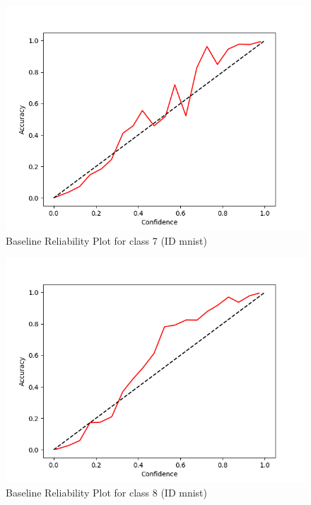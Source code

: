\documentclass[11pt]{article}
\begin{document}
\begin{figure}[htbp]
\centering
\includegraphics[width=.9\linewidth]{./base_mnist_rel_7.png}
\caption{\label{fig:orgc5350fc}
Baseline Reliability Plot for class 7 (ID mnist)}
\end{figure}

\begin{figure}[htbp]
\centering
\includegraphics[width=.9\linewidth]{./base_mnist_rel_8.png}
\caption{\label{fig:orgaaaec75}
Baseline Reliability Plot for class 8 (ID mnist)}
\end{figure}
\end{document}
